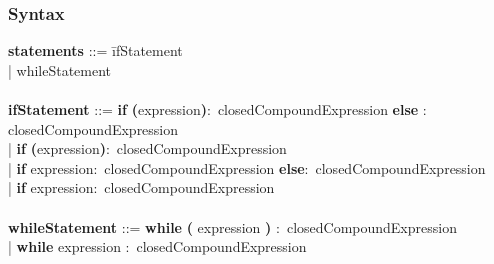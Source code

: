     \subsubsection{Syntax}
        \begin{tabbing}
        {\bf statements}                  ::= \=ifStatement\\
                                          \>| whileStatement\\
        \\
        {\bf ifStatement}                 ::= \=\textbf{if} \=\textbf{(}expression\textbf{)}$\colon$ closedCompoundExpression \textbf    {else} $\colon$ closedCompoundExpression\\
                                      \>| \textbf{if} \textbf{(}expression\textbf{)}$\colon$ closedCompoundExpression\\
                                      \>| \textbf{if} expression$\colon$ closedCompoundExpression \textbf{else}$\colon$ closedCompoundExpression\\
                                      \>| \textbf{if} expression$\colon$ closedCompoundExpression\\
        \\
        {\bf whileStatement}              ::= \=\textbf{while} \textbf{(} expression \textbf{)} $\colon$ closedCompoundExpression\\
                                      \>| \textbf{while} expression $\colon$ closedCompoundExpression\\
        \\ 
        \end{tabbing}
